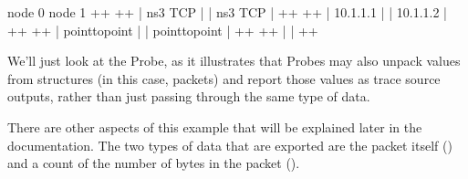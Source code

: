 \documentclass[letterpaper,10pt,english]{sphinxmanual}
\begin{document}
\begin{sphinxVerbatim}[commandchars=\\\{\}]
      node 0                 node 1
+\PYGZhy{}\PYGZhy{}\PYGZhy{}\PYGZhy{}\PYGZhy{}\PYGZhy{}\PYGZhy{}\PYGZhy{}\PYGZhy{}\PYGZhy{}\PYGZhy{}\PYGZhy{}\PYGZhy{}\PYGZhy{}\PYGZhy{}\PYGZhy{}+    +\PYGZhy{}\PYGZhy{}\PYGZhy{}\PYGZhy{}\PYGZhy{}\PYGZhy{}\PYGZhy{}\PYGZhy{}\PYGZhy{}\PYGZhy{}\PYGZhy{}\PYGZhy{}\PYGZhy{}\PYGZhy{}\PYGZhy{}\PYGZhy{}+
|    ns\PYGZhy{}3 TCP    |    |    ns\PYGZhy{}3 TCP    |
+\PYGZhy{}\PYGZhy{}\PYGZhy{}\PYGZhy{}\PYGZhy{}\PYGZhy{}\PYGZhy{}\PYGZhy{}\PYGZhy{}\PYGZhy{}\PYGZhy{}\PYGZhy{}\PYGZhy{}\PYGZhy{}\PYGZhy{}\PYGZhy{}+    +\PYGZhy{}\PYGZhy{}\PYGZhy{}\PYGZhy{}\PYGZhy{}\PYGZhy{}\PYGZhy{}\PYGZhy{}\PYGZhy{}\PYGZhy{}\PYGZhy{}\PYGZhy{}\PYGZhy{}\PYGZhy{}\PYGZhy{}\PYGZhy{}+
|    10.1.1.1    |    |    10.1.1.2    |
+\PYGZhy{}\PYGZhy{}\PYGZhy{}\PYGZhy{}\PYGZhy{}\PYGZhy{}\PYGZhy{}\PYGZhy{}\PYGZhy{}\PYGZhy{}\PYGZhy{}\PYGZhy{}\PYGZhy{}\PYGZhy{}\PYGZhy{}\PYGZhy{}+    +\PYGZhy{}\PYGZhy{}\PYGZhy{}\PYGZhy{}\PYGZhy{}\PYGZhy{}\PYGZhy{}\PYGZhy{}\PYGZhy{}\PYGZhy{}\PYGZhy{}\PYGZhy{}\PYGZhy{}\PYGZhy{}\PYGZhy{}\PYGZhy{}+
| point\PYGZhy{}to\PYGZhy{}point |    | point\PYGZhy{}to\PYGZhy{}point |
+\PYGZhy{}\PYGZhy{}\PYGZhy{}\PYGZhy{}\PYGZhy{}\PYGZhy{}\PYGZhy{}\PYGZhy{}\PYGZhy{}\PYGZhy{}\PYGZhy{}\PYGZhy{}\PYGZhy{}\PYGZhy{}\PYGZhy{}\PYGZhy{}+    +\PYGZhy{}\PYGZhy{}\PYGZhy{}\PYGZhy{}\PYGZhy{}\PYGZhy{}\PYGZhy{}\PYGZhy{}\PYGZhy{}\PYGZhy{}\PYGZhy{}\PYGZhy{}\PYGZhy{}\PYGZhy{}\PYGZhy{}\PYGZhy{}+
        |                     |
        +\PYGZhy{}\PYGZhy{}\PYGZhy{}\PYGZhy{}\PYGZhy{}\PYGZhy{}\PYGZhy{}\PYGZhy{}\PYGZhy{}\PYGZhy{}\PYGZhy{}\PYGZhy{}\PYGZhy{}\PYGZhy{}\PYGZhy{}\PYGZhy{}\PYGZhy{}\PYGZhy{}\PYGZhy{}\PYGZhy{}\PYGZhy{}+
\end{sphinxVerbatim}

We’ll just look at the Probe, as it illustrates that Probes may also
unpack values from structures (in this case, packets) and report
those values as trace source outputs, rather than just passing through
the same type of data.

There are other aspects of this example that will be explained later in
the documentation.  The two types of data that are exported are the packet
itself () and a count of the number of bytes in the packet
().
\end{document}
